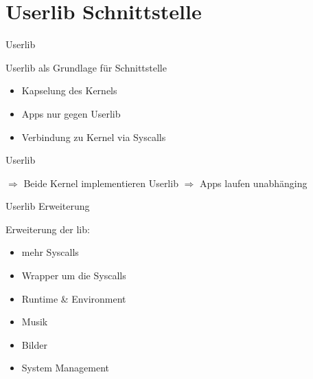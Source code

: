 \section{Userlib Schnittstelle}



\begin{frame}{Userlib}
    \begin{Large}
        Userlib als Grundlage für Schnittstelle
    \end{Large}
    \vspace{15pt}

    \begin{itemize}
        \item Kapselung des Kernels
        \item Apps nur gegen Userlib
        \item Verbindung zu Kernel via Syscalls
    \end{itemize}
    
\end{frame}


\begin{frame}{Userlib}
    \begin{Large}
        $\Rightarrow$ Beide Kernel implementieren Userlib \newline \newline
        $\Rightarrow$ Apps laufen unabhänging
    \end{Large}
    \vspace{15pt}
\end{frame}


\begin{frame}{Userlib Erweiterung}
    \begin{Large}
        Erweiterung der lib: {\tiny \cite{usrlib-repo}}
    \end{Large}
    \vspace{15pt}

    \begin{itemize}
        \item mehr Syscalls
        \item Wrapper um die Syscalls
        \item Runtime \& Environment
        \item Musik
        \item Bilder
        \item System Management
    \end{itemize}
\end{frame}



